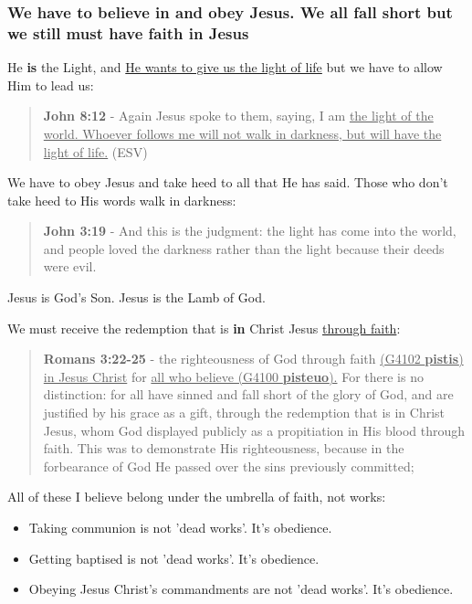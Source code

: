 \documentclass[11pt]{article}
\begin{document}
\subsubsection{We have to believe in and obey Jesus. We all fall short but we still must have faith in Jesus}
\label{sec:orgafb6e0b}
He \textbf{is} the Light, and \uline{He wants to give us the light of life} but we have to allow Him to lead us:

\begin{quote}
\textbf{John 8:12} - Again Jesus spoke to them, saying, I am \uline{the light of the world. Whoever follows me will not walk in darkness, but will have the light of life.} (ESV)
\end{quote}

We have to obey Jesus and take heed to all that He has said. Those who don't take heed to His words walk in darkness:

\begin{quote}
\textbf{John 3:19} - And this is the judgment: the light has come into the world, and people loved the darkness rather than the light because their deeds were evil.
\end{quote}

Jesus is God's Son.
Jesus is the Lamb of God.

We must receive the redemption that is \textbf{in} Christ Jesus \uline{through faith}:

\begin{quote}
\textbf{Romans 3:22-25} - the righteousness of God through faith \uline{(G4102 \textbf{pistis}) in Jesus Christ} for \uline{all who believe (G4100 \textbf{pisteuo}).} For there is no distinction: for all have sinned and fall short of the glory of God, and are justified by his grace as a gift, through the redemption that is in Christ Jesus, whom God displayed publicly as a propitiation in His blood through faith. This was to demonstrate His righteousness, because in the forbearance of God He passed over the sins previously committed;
\end{quote}

All of these I believe belong under the umbrella of faith, not works:
\begin{itemize}
\item Taking communion is not 'dead works'. It's obedience.
\item Getting baptised is not 'dead works'. It's obedience.
\item Obeying Jesus Christ's commandments are not 'dead works'. It's obedience.
\end{itemize}
\end{document}
